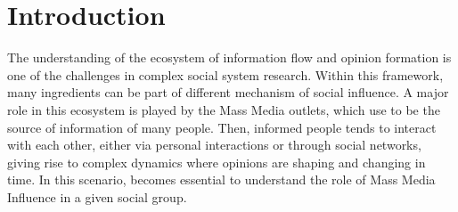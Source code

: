 \documentclass{bmcart}
\begin{document}



\section*{Introduction}


\par The understanding of the ecosystem of information flow and opinion formation is one of the challenges in  complex social system research. Within this framework, many ingredients can be part of different mechanism of social influence. A major role in this ecosystem is played by the Mass Media outlets, which use to be the source of information of many people.  Then, informed people tends to interact with each other, either via personal interactions or through social networks, giving rise to complex dynamics where opinions are shaping and changing in time. In this scenario, becomes essential to understand the role of Mass Media Influence in a given social group.
\end{document}
